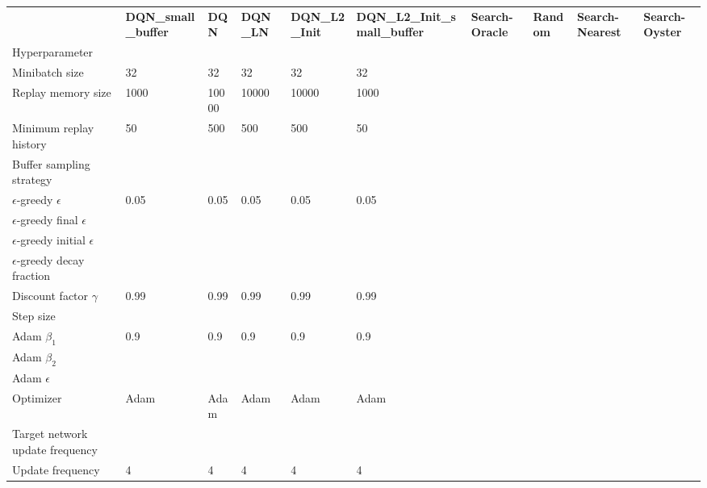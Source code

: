 \begin{tabular}{llllllllll}
 & \bfseries DQN_small_buffer & \bfseries DQN & \bfseries DQN_LN & \bfseries DQN_L2_Init & \bfseries DQN_L2_Init_small_buffer & \bfseries Search-Oracle & \bfseries Random & \bfseries Search-Nearest & \bfseries Search-Oyster \\
Hyperparameter &  &  &  &  &  &  &  &  &  \\
Minibatch size & 32 & 32 & 32 & 32 & 32 &  &  &  &  \\
Replay memory size & 1000 & 10000 & 10000 & 10000 & 1000 &  &  &  &  \\
Minimum replay history & 50 & 500 & 500 & 500 & 50 &  &  &  &  \\
Buffer sampling strategy &  &  &  &  &  &  &  &  &  \\
$\epsilon$-greedy $\epsilon$ & 0.05 & 0.05 & 0.05 & 0.05 & 0.05 &  &  &  &  \\
$\epsilon$-greedy final $\epsilon$ &  &  &  &  &  &  &  &  &  \\
$\epsilon$-greedy initial $\epsilon$ &  &  &  &  &  &  &  &  &  \\
$\epsilon$-greedy decay fraction &  &  &  &  &  &  &  &  &  \\
Discount factor $\gamma$ & 0.99 & 0.99 & 0.99 & 0.99 & 0.99 &  &  &  &  \\
Step size &  &  &  &  &  &  &  &  &  \\
Adam $\beta_1$ & 0.9 & 0.9 & 0.9 & 0.9 & 0.9 &  &  &  &  \\
Adam $\beta_2$ &  &  &  &  &  &  &  &  &  \\
Adam $\epsilon$ &  &  &  &  &  &  &  &  &  \\
Optimizer & Adam & Adam & Adam & Adam & Adam &  &  &  &  \\
Target network update frequency &  &  &  &  &  &  &  &  &  \\
Update frequency & 4 & 4 & 4 & 4 & 4 &  &  &  &  \\
\end{tabular}
